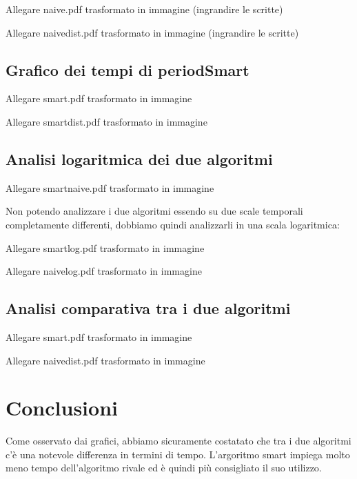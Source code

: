 \documentclass[a4paper,titlepage]{article}
\begin{document}
Allegare naive.pdf trasformato in immagine (ingrandire le scritte)

Allegare naivedist.pdf trasformato in immagine (ingrandire le scritte)

\subsection{Grafico dei tempi di periodSmart}

Allegare smart.pdf trasformato in immagine

Allegare smartdist.pdf trasformato in immagine

\subsection{Analisi logaritmica dei due algoritmi}

Allegare smartnaive.pdf trasformato in immagine

Non potendo analizzare i due algoritmi essendo su due scale temporali completamente differenti, dobbiamo quindi analizzarli in una scala logaritmica:

Allegare smartlog.pdf trasformato in immagine

Allegare naivelog.pdf trasformato in immagine

\subsection{Analisi comparativa tra i due algoritmi}

Allegare smart.pdf trasformato in immagine

Allegare naivedist.pdf trasformato in immagine

\section{Conclusioni}

Come osservato dai grafici, abbiamo sicuramente costatato che tra i due algoritmi c’è una notevole differenza in termini di tempo.
L’argoritmo smart impiega molto meno tempo dell'algoritmo rivale ed è quindi più consigliato il suo utilizzo.
\end{document}
